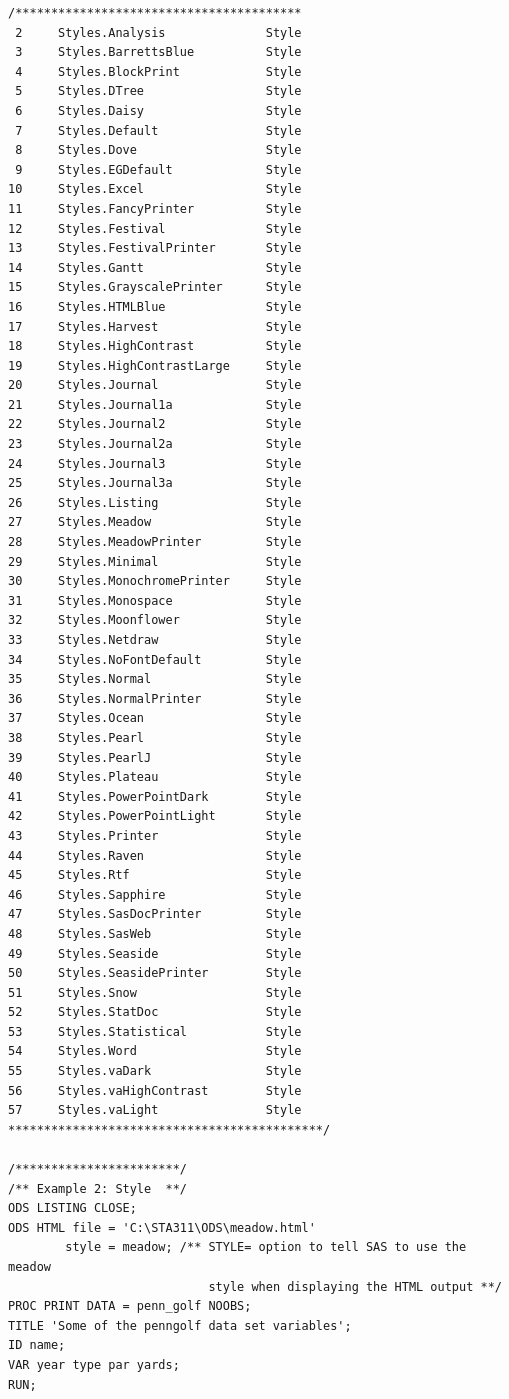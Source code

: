 \documentclass[
]{book}
\begin{document}
\begin{verbatim}
/****************************************
 2     Styles.Analysis              Style
 3     Styles.BarrettsBlue          Style
 4     Styles.BlockPrint            Style
 5     Styles.DTree                 Style
 6     Styles.Daisy                 Style
 7     Styles.Default               Style
 8     Styles.Dove                  Style
 9     Styles.EGDefault             Style
10     Styles.Excel                 Style
11     Styles.FancyPrinter          Style
12     Styles.Festival              Style
13     Styles.FestivalPrinter       Style
14     Styles.Gantt                 Style
15     Styles.GrayscalePrinter      Style
16     Styles.HTMLBlue              Style
17     Styles.Harvest               Style
18     Styles.HighContrast          Style
19     Styles.HighContrastLarge     Style
20     Styles.Journal               Style
21     Styles.Journal1a             Style
22     Styles.Journal2              Style
23     Styles.Journal2a             Style
24     Styles.Journal3              Style
25     Styles.Journal3a             Style
26     Styles.Listing               Style
27     Styles.Meadow                Style
28     Styles.MeadowPrinter         Style
29     Styles.Minimal               Style
30     Styles.MonochromePrinter     Style
31     Styles.Monospace             Style
32     Styles.Moonflower            Style
33     Styles.Netdraw               Style
34     Styles.NoFontDefault         Style
35     Styles.Normal                Style
36     Styles.NormalPrinter         Style
37     Styles.Ocean                 Style
38     Styles.Pearl                 Style
39     Styles.PearlJ                Style
40     Styles.Plateau               Style
41     Styles.PowerPointDark        Style
42     Styles.PowerPointLight       Style
43     Styles.Printer               Style
44     Styles.Raven                 Style
45     Styles.Rtf                   Style
46     Styles.Sapphire              Style
47     Styles.SasDocPrinter         Style
48     Styles.SasWeb                Style
49     Styles.Seaside               Style
50     Styles.SeasidePrinter        Style
51     Styles.Snow                  Style
52     Styles.StatDoc               Style
53     Styles.Statistical           Style
54     Styles.Word                  Style
55     Styles.vaDark                Style
56     Styles.vaHighContrast        Style
57     Styles.vaLight               Style
********************************************/

/***********************/
/** Example 2: Style  **/
ODS LISTING CLOSE;
ODS HTML file = 'C:\STA311\ODS\meadow.html'
        style = meadow; /** STYLE= option to tell SAS to use the meadow 
                            style when displaying the HTML output **/
PROC PRINT DATA = penn_golf NOOBS;
TITLE 'Some of the penngolf data set variables';
ID name;
VAR year type par yards;
RUN;
 

\end{verbatim}
\end{document}
